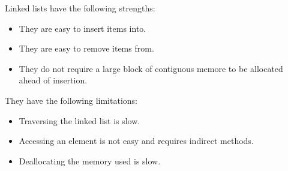 
Linked lists have the following strengths:
\begin{itemize}
    \item They are easy to insert items into.
    \item They are easy to remove items from.
    \item They do not require a large block of contiguous memore to be allocated
    ahead of insertion.
\end{itemize}
They have the following limitations:
\begin{itemize}
    \item Traversing the linked list is slow.
    \item Accessing an element is not easy and requires indirect methods.
    \item Deallocating the memory used is slow.
\end{itemize}
